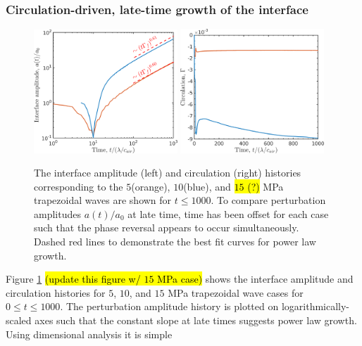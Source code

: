 \subsubsection{Circulation-driven, late-time growth of the interface}
\begin{figure}[h]
  \centering
  \includegraphics[width=0.48\textwidth]{./figs/lung_figs/interface_multi-amp_loglog_roe_t1000}
  \includegraphics[width=0.48\textwidth]{./figs/lung_figs/circulation_multi-amp_roe_t1000}
  \caption[The interface and circulation dependence on wave amplitude
  at long time]{The interface amplitude (left) and circulation (right)
    histories corresponding to the $5$(orange), $10$(blue), and
    \hl{$15$ (?)} MPa trapezoidal waves are shown for $t\leq 1000$. To
    compare perturbation amplitudes $a(t)/a_0$ at late time,
    time has been offset for each case such that the phase reversal appears to occur
    simultaneously. Dashed red lines to demonstrate the best fit
    curves for power law growth.}
  \label{fig:trapz_circ_interface_loglog}
\end{figure}
% 
Figure \ref{fig:trapz_circ_interface_loglog} \hl{(update this figure
  w/ $15$ MPa case)} shows the interface amplitude and circulation
histories for $5$, $10$, and $15$ MPa trapezoidal wave cases for
$0 \leq t\leq 1000$. The perturbation amplitude history is plotted on
logarithmically-scaled axes such that the constant slope at late times
suggests power law growth. Using dimensional analysis it is simple
